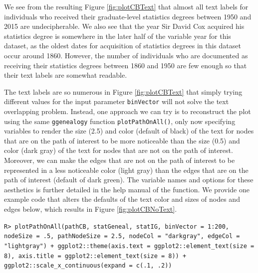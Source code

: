 \documentclass[11pt,a4paper,oldfontcommands,openany]{memoir}
\DeclareRobustCommand{\mybox}[2][gray!15]{%
\begin{tcolorbox}[   %
        breakable,
        left=0pt,
        right=0pt,
        top=0pt,
        bottom=0pt,
        colback=#1,
        colframe=#1,
        width=\dimexpr\textwidth\relax, 
        enlarge left by=0mm,
        boxsep=5pt,
        arc=0pt,outer arc=0pt,
        ]
        #2
\end{tcolorbox}
}
\numberwithin{equation}{section} %
\newcommand{\code}[1]{{\texttt{#1}}}
\newcommand{\pkg}[1]{{\texttt{#1}}}
\begin{document}
We see from the resulting Figure \ref{fig:plotCBText} that almost all text labels for individuals who received their graduate-level statistics degrees between 1950 and 2015 are undecipherable. We also see that the year Sir David Cox acquired his statistics degree is somewhere in the later half of the variable year for this dataset, as the oldest dates for acquisition of statistics degrees in this dataset occur around 1860. However, the number of individuals who are documented as receiving their statistics degrees between 1860 and 1950 are few enough so that their text labels are somewhat readable.

The text labels are so numerous in Figure \ref{fig:plotCBText} that simply trying different values for the input parameter \code{binVector} will not solve the text overlapping problem. Instead, one approach we can try is to reconstruct the plot using the same \pkg{ggenealogy} function \code{plotPathOnAll()}, only now specifying variables to render the size (2.5) and color (default of black) of the text for nodes that are on the path of interest to be more noticeable than the size (0.5) and color (dark gray) of the text for nodes that are not on the path of interest. Moreover, we can make the edges that are not on the path of interest to be represented in a less noticeable color (light gray) than the edges that are on the path of interest (default of dark green). The variable names and options for these aesthetics is further detailed in the help manual of the function. We provide one example code that alters the defaults of the text color and sizes of nodes and edges below, which results in Figure \ref{fig:plotCBNoText}.

\mybox{
\texttt{R> plotPathOnAll(pathCB, statGeneal, statIG, binVector = 1:200, nodeSize = .5, pathNodeSize = 2.5, nodeCol = "darkgray", edgeCol = "lightgray") + ggplot2::theme(axis.text = ggplot2::element\_text(size = 8), axis.title = ggplot2::element\_text(size = 8)) + ggplot2::scale\_x\_continuous(expand = c(.1, .2))}
}
\end{document}
